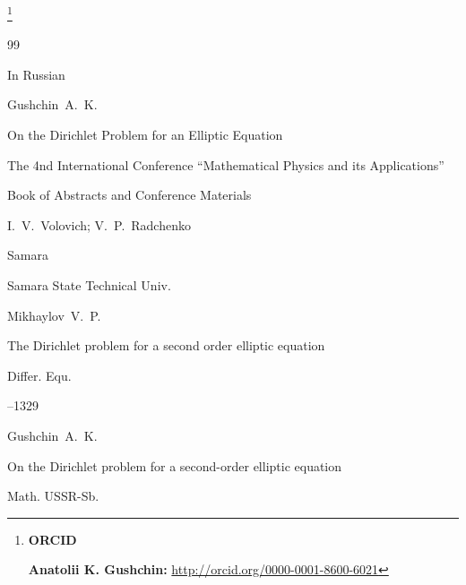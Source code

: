 \thanks{{\bf ORCID}



{\bf Anatolii K. Gushchin:} \url{http://orcid.org/0000-0001-8600-6021}







}





\EngRef





\begin{thebibliography}{99}




\lang In Russian

\by Gushchin~A.~K.

\paper On the Dirichlet Problem for an Elliptic Equation


\inbook  The 4nd International Conference ``Mathematical Physics and its Applications''

\bookinfo Book of Abstracts and Conference Materials

\eds I.~V.~Volovich; V.~P.~Radchenko

\publaddr Samara

\publ Samara State Technical Univ.







\by Mikhaylov~V.~P.

\paper The Dirichlet problem for a second order elliptic equation

\jour Differ. Equ.




–1329 





\by Gushchin~A.~K.

\paper On the Dirichlet problem for a second-order elliptic equation

\jour Math. USSR-Sb.



\end{thebibliography}
